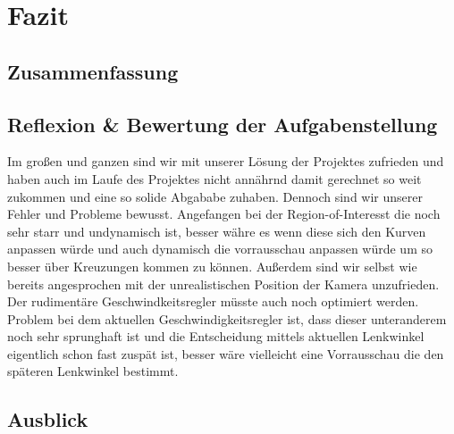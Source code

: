 \section{Fazit}
	
	\subsection{Zusammenfassung}
	
	\subsection{Reflexion \& Bewertung der Aufgabenstellung}
	Im großen und ganzen sind wir mit unserer Lösung der Projektes zufrieden und haben auch im Laufe des Projektes nicht annährnd damit gerechnet so weit zukommen und eine so solide Abgababe zuhaben. Dennoch sind wir unserer Fehler und Probleme bewusst. Angefangen bei der Region-of-Interesst die noch sehr starr und undynamisch ist, besser währe es wenn diese sich den Kurven anpassen würde und auch dynamisch die vorrausschau anpassen würde um so besser über Kreuzungen kommen zu können. Außerdem sind wir selbst wie bereits angesprochen mit der unrealistischen Position der Kamera unzufrieden. Der rudimentäre Geschwindkeitsregler müsste auch noch optimiert werden. Problem bei dem aktuellen Geschwindigkeitsregler ist, dass dieser unteranderem noch sehr sprunghaft ist und die Entscheidung mittels aktuellen Lenkwinkel eigentlich schon fast zuspät ist, besser wäre vielleicht eine Vorrausschau die den späteren Lenkwinkel bestimmt. 
	\subsection{Ausblick}
	